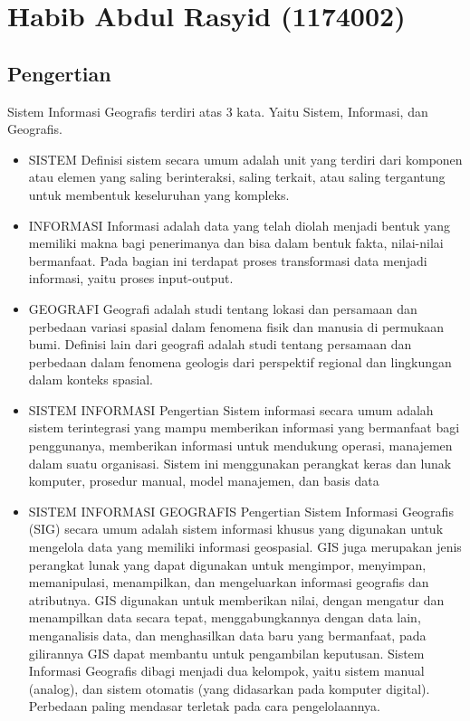 \section{Habib Abdul Rasyid (1174002)}
\subsection{Pengertian}
Sistem Informasi Geografis terdiri atas 3 kata. Yaitu Sistem, Informasi, dan Geografis.
\begin{itemize}
	\item SISTEM \break
Definisi sistem secara umum adalah unit yang terdiri dari komponen atau elemen yang saling berinteraksi, saling terkait, atau saling tergantung untuk membentuk keseluruhan yang kompleks.
	\item INFORMASI \break
Informasi adalah data yang telah diolah menjadi bentuk yang memiliki makna bagi penerimanya dan bisa dalam bentuk fakta, nilai-nilai bermanfaat. Pada bagian ini terdapat proses transformasi data menjadi informasi, yaitu proses input-output.
	\item GEOGRAFI \break
Geografi adalah studi tentang lokasi dan persamaan dan perbedaan variasi spasial dalam fenomena fisik dan manusia di permukaan bumi. Definisi lain dari geografi adalah studi tentang persamaan dan perbedaan dalam fenomena geologis dari perspektif regional dan lingkungan dalam konteks spasial.
	\item SISTEM INFORMASI \break
Pengertian Sistem informasi secara umum adalah sistem terintegrasi yang mampu memberikan informasi yang bermanfaat bagi penggunanya, memberikan informasi untuk mendukung operasi, manajemen dalam suatu organisasi. Sistem ini menggunakan perangkat keras dan lunak komputer, prosedur manual, model manajemen, dan basis data
	\item SISTEM INFORMASI GEOGRAFIS \break
Pengertian Sistem Informasi Geografis (SIG) secara umum adalah sistem informasi khusus yang digunakan untuk mengelola data yang memiliki informasi geospasial. GIS juga merupakan jenis perangkat lunak yang dapat digunakan untuk mengimpor, menyimpan, memanipulasi, menampilkan, dan mengeluarkan informasi geografis dan atributnya. GIS digunakan untuk memberikan nilai, dengan mengatur dan menampilkan data secara tepat, menggabungkannya dengan data lain, menganalisis data, dan menghasilkan data baru yang bermanfaat, pada gilirannya GIS dapat membantu untuk pengambilan keputusan. Sistem Informasi Geografis dibagi menjadi dua kelompok, yaitu sistem manual (analog), dan sistem otomatis (yang didasarkan pada komputer digital). Perbedaan paling mendasar terletak pada cara pengelolaannya.
\end{itemize}


